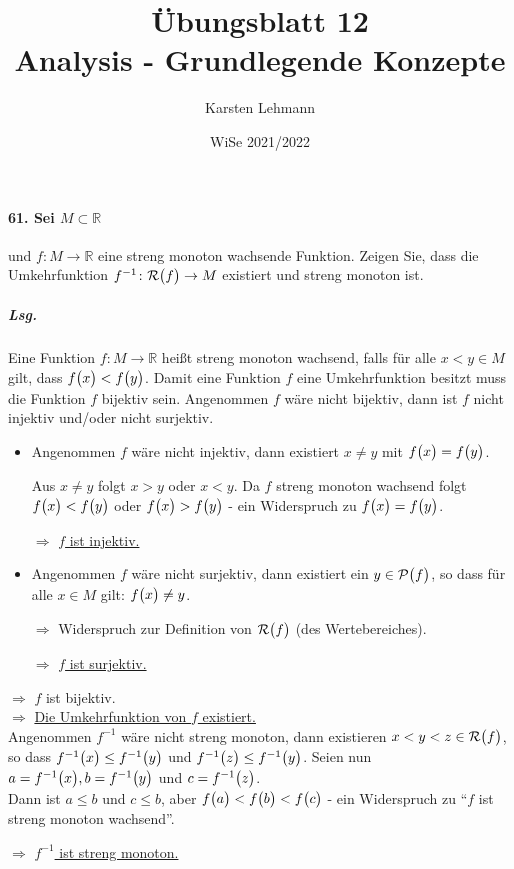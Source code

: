 \documentclass{scrreprt}
\author{Karsten Lehmann}
\date{WiSe 2021/2022}
\title{Übungsblatt 12\\Analysis - Grundlegende Konzepte}
\begin{document}
\paragraph{61. Sei $M \subset \mathbb{R}$} und $f \colon M \to \mathbb{R}$
eine streng monoton wachsende Funktion.
Zeigen Sie, dass die Umkehrfunktion $f^{-1} \colon \mathcal{R}\qty\big(f) \to M$
existiert und streng monoton ist.

\subparagraph{Lsg.} Eine Funktion $f \colon M \to \mathbb{R}$ heißt streng
monoton wachsend, falls für alle $x < y \in M$ gilt, dass
$f\qty\big(x) < f\qty\big(y)$.
Damit eine Funktion $f$ eine Umkehrfunktion besitzt muss die Funktion $f$
bijektiv sein.
Angenommen $f$ wäre nicht bijektiv, dann ist $f$ nicht injektiv und/oder nicht
surjektiv.

\begin{itemize}
\item Angenommen $f$ wäre nicht injektiv, dann existiert $x \ne y$ mit
  $f\qty\big(x) = f\qty\big(y)$.

  Aus $x \ne y$ folgt $x > y$ oder $x < y$.
  Da $f$ streng monoton wachsend folgt $f\qty\big(x) < f\qty\big(y)$
  oder $f\qty\big(x) > f\qty\big(y)$ - ein Widerspruch zu
  $f\qty\big(x) = f\qty\big(y)$.

  $\Rightarrow$ \underline{$f$ ist injektiv.}

\item Angenommen $f$ wäre nicht surjektiv, dann existiert ein
  $y \in \mathcal{P}\qty\big(f)$, so dass für alle $x \in M$ gilt:
  $f\qty\big(x) \ne y$.

  $\Rightarrow$ Widerspruch zur Definition von $\mathcal{R}\qty\big(f)$
  (des Wertebereiches).

  $\Rightarrow$ \underline{$f$ ist surjektiv.}
\end{itemize}
$\Rightarrow$ $f$ ist bijektiv. \\
$\Rightarrow$ \underline{Die Umkehrfunktion von $f$ existiert.} \\
Angenommen $f^{-1}$ wäre nicht streng monoton, dann existieren
$x < y < z\in \mathcal{R}\qty\big(f)$, so dass
$f^{-1}\qty\big(x) \leq f^{-1}\qty\big(y)$ und
$f^{-1}\qty\big(z) \leq f^{-1}\qty\big(y)$.
Seien nun $a = f^{-1}\qty\big(x), b = f^{-1}\qty\big(y)$ und
$c = f^{-1}\qty\big(z)$. \\
Dann ist $a \leq b$ und $c \leq b$, aber
$f\qty\big(a) < f\qty\big(b) <f\qty\big(c)$ - ein Widerspruch zu
``$f$ ist streng monoton wachsend''.

$\Rightarrow$ \underline{$f^{-1}$ ist streng monoton.}
\end{document}
